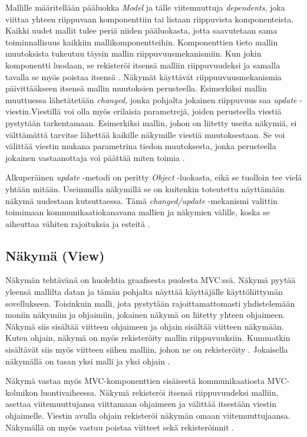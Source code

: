 \documentclass[utf8]{gradu3}
\begin{document}
Mallille määritellään pääluokka \emph{Model} ja tälle viitemuuttuja \emph{dependents}, joka viittaa yhteen riippuvaan komponenttiin tai listaan riippuvista komponenteista. Kaikki uudet mallit tulee periä niiden pääluokasta, jotta saavutetaan sama toiminnallisuus kaikkiin mallikomponentteihin. Komponenttien tieto mallin muutoksista tukeutuu täysin mallin riippuvuusmekanismiin. Kun jokin komponentti luodaan, se rekisteröi itsensä malliin riippuvuudeksi ja samalla tavalla se myös poistaa itsensä \parencite{burbeck}. Näkymät käyttävät riippuuvuusmekanismia päivittääkseen itsensä mallin muutoksien perusteella. Esimerkiksi mallin muuttuessa lähetätetään \textit{changed}, jonka pohjalta jokainen riippuvuus saa \textit{update} -viestin.Viestillä voi olla myös erilaisia parametrejä, joiden perusteella viestiä pystytään tarkentamaan. Esimerkiksi mallin, johon on liitetty useita näkymiä, ei välttämättä tarvitse lähettää kaikille näkymille viestiä muutoksestaan. Se voi välittää viestin mukana parametrina tiedon muutoksesta, jonka perusteella jokainen vastaanottaja voi päättää miten toimia \parencite{burbeck}.

Alkuperäinen \textit{update} -metodi on peritty \textit{Object} -luokasta, eikä se tuolloin tee vielä yhtään mitään. Useimmilla näkymillä se on kuitenkin toteutettu näyttämään näkymä uudestaan kutsuttaessa. Tämä \textit{changed/update} -mekanismi valittin toimimaan kommunikaatiokanavana mallien ja näkymien välille, koska se aiheuttaa vähiten rajoituksia ja esteitä \parencite{burbeck}. 

\subsection{Näkymä (View)}
Näkymän tehtävänä on huolehtia graafisesta puolesta MVC:ssä. Näkymä pyytää yleensä mallilta datan ja tämän pohjalta näyttää käyttäjälle käyttöliittymän sovellukseen. Toisinkuin malli, jota pystytään rajoittamattomasti yhdistelemään moniin näkymiin ja ohjaimiin, jokainen näkymä on liitetty yhteen ohjaimeen.  Näkymä siis sisältää viitteen ohjaimeen ja ohjain sisältää viitteen näkymään. Kuten ohjain, näkymä on myös rekisteröity mallin riippuvuuksiin. Kummatkin sisältävät siis myös viitteen siihen malliin, johon ne on rekisteröity \parencite{burbeck}. Jokaisella näkymällä on tasan yksi malli ja yksi ohjain \parencite[s. 7]{krasner_desc}.

Näkymä vastaa myös MVC-komponenttien sisäisestä kommunikaatiosta MVC-kolmikon luontivaiheessa. Näkymä rekisteröi itsensä  riippuvuudeksi malliin, asettaa viitemuuttujansa viittamaan ohjaimeen ja välittää itsestään viestin ohjaimelle. Viestin avulla ohjain rekisteröi näkymän omaan viitemuuttujaansa. Näkymällä on myös vastuu poistaa viitteet sekä rekisteröinnit \parencite{burbeck}. 
\end{document}
